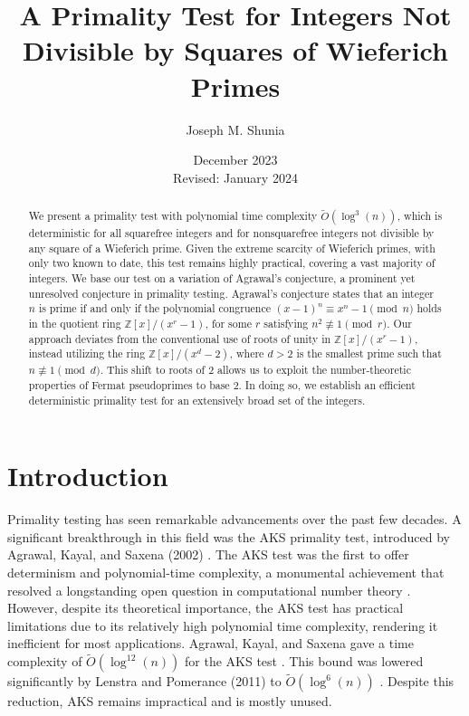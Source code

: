\documentclass{article}
\title{A Primality Test for Integers Not Divisible by Squares of Wieferich Primes}
\author{Joseph M. Shunia}
\date{December 2023 \\ \small Revised: January 2024 \normalsize}
\theoremstyle{plain}
\theoremstyle{definition}
\newcommand{\softO}[1]{\tilde{O}(#1)}
\begin{document}
\maketitle

\begin{abstract}
We present a primality test with polynomial time complexity $\softO{\log^3(n)}$, which is deterministic for all squarefree integers and for nonsquarefree integers not divisible by any square of a Wieferich prime. Given the extreme scarcity of Wieferich primes, with only two known to date, this test remains highly practical, covering a vast majority of integers. We base our test on a variation of Agrawal's conjecture, a prominent yet unresolved conjecture in primality testing. Agrawal's conjecture states that an integer $n$ is prime if and only if the polynomial congruence $(x - 1)^n \equiv x^n - 1 \pmod{n}$ holds in the quotient ring $\mathbb{Z}[x]/(x^r - 1)$, for some $r$ satisfying $n^2 \not\equiv 1 \pmod{r}$. Our approach deviates from the conventional use of roots of unity in $\mathbb{Z}[x]/(x^r - 1)$, instead utilizing the ring $\mathbb{Z}[x]/(x^d - 2)$, where $d > 2$ is the smallest prime such that $n \not\equiv 1 \pmod{d}$. This shift to roots of $2$ allows us to exploit the number-theoretic properties of Fermat pseudoprimes to base $2$. In doing so, we establish an efficient deterministic primality test for an extensively broad set of the integers.
\end{abstract}

\section{Introduction}

Primality testing has seen remarkable advancements over the past few decades. A significant breakthrough in this field was the AKS primality test, introduced by Agrawal, Kayal, and Saxena (2002) \cite{aks2002}. The AKS test was the first to offer determinism and polynomial-time complexity, a monumental achievement that resolved a longstanding open question in computational number theory \cite{goldreich2008}. However, despite its theoretical importance, the AKS test has practical limitations due to its relatively high polynomial time complexity, rendering it inefficient for most applications. Agrawal, Kayal, and Saxena gave a time complexity of $\tilde{O}(\log^{12}(n))$ for the AKS test \cite{aks2002}. This bound was lowered significantly by Lenstra and Pomerance (2011) to $\tilde{O}(\log^6(n))$ \cite{lenstra2011}. Despite this reduction, AKS remains impractical and is mostly unused.
\end{document}
